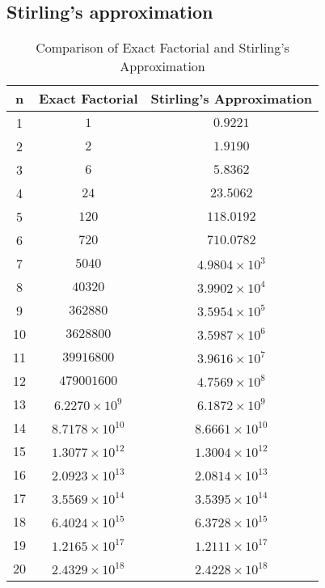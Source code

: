 \begin{appendices}

\section{Stirling's approximation}
\begin{table}[ht]
\centering
\begin{tabular}{|c|c|c|}
\toprule
\textbf{n} & \textbf{Exact Factorial} & \textbf{Stirling's Approximation} \\ \midrule
1 & $1$ & $0.9221$ \\
2 & $2$ & $1.9190$ \\
3 & $6$ & $5.8362$ \\
4 & $24$ & $23.5062$ \\
5 & $120$ & $118.0192$ \\
6 & $720$ & $710.0782$ \\
7 & $5040$ & $4.9804 \times 10^3$ \\
8 & $40320$ & $3.9902 \times 10^4$ \\
9 & $362880$ & $3.5954 \times 10^5$ \\
10 & $3628800$ & $3.5987 \times 10^6$ \\
11 & $39916800$ & $3.9616 \times 10^7$ \\
12 & $479001600$ & $4.7569 \times 10^8$ \\
13 & $6.2270 \times 10^9$ & $6.1872 \times 10^9$ \\
14 & $8.7178 \times 10^{10}$ & $8.6661 \times 10^{10}$ \\
15 & $1.3077 \times 10^{12}$ & $1.3004 \times 10^{12}$ \\
16 & $2.0923 \times 10^{13}$ & $2.0814 \times 10^{13}$ \\
17 & $3.5569 \times 10^{14}$ & $3.5395 \times 10^{14}$ \\
18 & $6.4024 \times 10^{15}$ & $6.3728 \times 10^{15}$ \\
19 & $1.2165 \times 10^{17}$ & $1.2111 \times 10^{17}$ \\
20 & $2.4329 \times 10^{18}$ & $2.4228 \times 10^{18}$ \\
\bottomrule
\end{tabular}
\caption{Comparison of Exact Factorial and Stirling's Approximation}
\label{tab:factorial_stirling}
\end{table}


\end{appendices}
